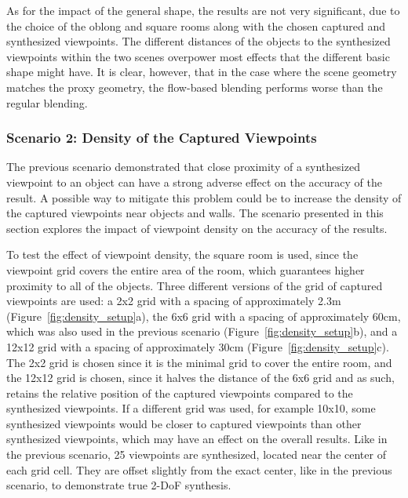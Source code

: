 As for the impact of the general shape, the results are not very significant, due to the choice of the oblong and square rooms along with the chosen captured and synthesized viewpoints. The different distances of the objects to the synthesized viewpoints within the two scenes overpower most effects that the different basic shape might have. It is clear, however, that in the case where the scene geometry matches the proxy geometry, the flow-based blending performs worse than the regular blending.























\subsubsection{Scenario 2: Density of the Captured Viewpoints}
The previous scenario demonstrated that close proximity of a synthesized viewpoint to an object can have a strong adverse effect on the accuracy of the result. A possible way to mitigate this problem could be to increase the density of the captured viewpoints near objects and walls. The scenario presented in this section explores the impact of viewpoint density on the accuracy of the results.

To test the effect of viewpoint density, the square room is used, since the viewpoint grid covers the entire area of the room, which guarantees higher proximity to all of the objects. Three different versions of the grid of captured viewpoints are used: a 2x2 grid with a spacing of approximately 2.3m (Figure~\ref{fig:density_setup}a), the 6x6 grid with a spacing of approximately 60cm, which was also used in the previous scenario (Figure~\ref{fig:density_setup}b), and a 12x12 grid with a spacing of approximately 30cm (Figure~\ref{fig:density_setup}c). The 2x2 grid is chosen since it is the minimal grid to cover the entire room, and the 12x12 grid is chosen, since it halves the distance of the 6x6 grid and as such, retains the relative position of the captured viewpoints compared to the synthesized viewpoints. If a different grid was used, for example 10x10, some synthesized viewpoints would be closer to captured viewpoints than other synthesized viewpoints, which may have an effect on the overall results.
Like in the previous scenario, 25 viewpoints are synthesized, located near the center of each grid cell. They are offset slightly from the exact center, like in the previous scenario, to demonstrate true 2-DoF synthesis.

